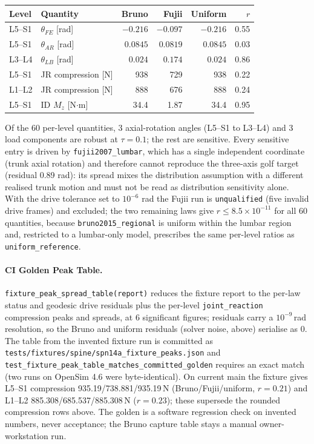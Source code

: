 \begin{center}
\begin{tabular}{llrrrr}
\hline
Level & Quantity & Bruno & Fujii & Uniform & $r$ \\
\hline
L5--S1 & $\theta_{FE}$ [rad] & $-0.216$ & $-0.097$ & $-0.216$ & 0.55 \\
L5--S1 & $\theta_{AR}$ [rad] & $0.0845$ & $0.0819$ & $0.0845$ & 0.03 \\
L3--L4 & $\theta_{LB}$ [rad] & $0.024$ & $0.174$ & $0.024$ & 0.86 \\
L5--S1 & JR compression [N] & 938 & 729 & 938 & 0.22 \\
L1--L2 & JR compression [N] & 888 & 676 & 888 & 0.24 \\
L5--S1 & ID $M_z$ [N$\cdot$m] & 34.4 & 1.87 & 34.4 & 0.95 \\
\hline
\end{tabular}
\end{center}

Of the 60 per-level quantities, 3 axial-rotation angles (L5--S1 to L3--L4) and
3 load components are robust at $\tau=0.1$; the rest are sensitive. Every
sensitive entry is driven by \texttt{fujii2007\_lumbar}, which has a single
independent coordinate (trunk axial rotation) and therefore cannot reproduce
the three-axis golf target (residual 0.89 rad): its spread mixes the
distribution assumption with a different realised trunk motion and must not be
read as distribution sensitivity alone. With the drive tolerance set to
$10^{-6}$ rad the Fujii run is \texttt{unqualified} (five invalid drive frames)
and excluded; the two remaining laws give $r\le 8.5\times10^{-11}$ for all 60
quantities, because \texttt{bruno2015\_regional} is uniform within the lumbar
region and, restricted to a lumbar-only model, prescribes the same per-level
ratios as \texttt{uniform\_reference}.

\paragraph{CI Golden Peak Table.}
\texttt{fixture\_peak\_spread\_table(report)} reduces the fixture report to the
per-law status and geodesic drive residuals plus the per-level
\texttt{joint\_reaction} compression peaks and spreads, at 6 significant
figures; residuals carry a $10^{-9}$\,rad resolution, so the Bruno and uniform
residuals (solver noise, above) serialise as 0. The table from the invented
fixture run is committed as \texttt{tests/fixtures/spine/spn14a\_fixture\_peaks.json}
and \texttt{test\_fixture\_peak\_table\_matches\_committed\_golden} requires an
exact match (two runs on OpenSim 4.6 were byte-identical). On current main the
fixture gives L5--S1 compression 935.19/738.881/935.19\,N (Bruno/Fujii/uniform,
$r=0.21$) and L1--L2 885.308/685.537/885.308\,N ($r=0.23$); these supersede the
rounded compression rows above. The golden is a software regression check on
invented numbers, never acceptance; the Bruno capture table stays a manual
owner-workstation run.

